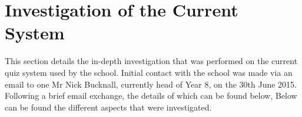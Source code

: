 \section{Investigation of the Current System}
This section details the in-depth investigation that was performed on the current quiz system used by the school. Initial contact with the school was made via an email to one Mr Nick Bucknall, currently head of Year 8, on the 30th June 2015. Following a brief email exchange, the details of which can be found below, Below can be found the different aspects that were investigated.















